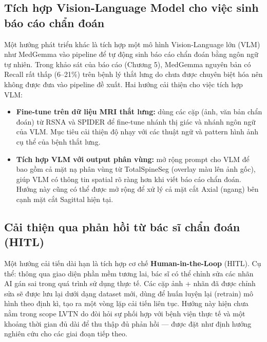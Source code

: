 \subsection{Tích hợp Vision-Language Model cho việc sinh báo cáo chẩn đoán}
Một hướng phát triển khác là tích hợp một mô hình Vision-Language lớn (VLM) như MedGemma vào pipeline để tự động sinh báo cáo chẩn đoán bằng ngôn ngữ tự nhiên. Trong khảo sát của báo cáo (Chương 5), MedGemma nguyên bản có Recall rất thấp (6--21\%) trên bệnh lý thắt lưng do chưa được chuyên biệt hóa nên không được đưa vào pipeline đề xuất. Hai hướng cải thiện cho việc tích hợp VLM:
\begin{itemize}
    \item \textbf{Fine-tune trên dữ liệu MRI thắt lưng:} dùng các cặp (ảnh, văn bản chẩn đoán) từ RSNA và SPIDER để fine-tune nhánh thị giác và nhánh ngôn ngữ của VLM. Mục tiêu cải thiện độ nhạy với các thuật ngữ và pattern hình ảnh cụ thể của bệnh thắt lưng.
    \item \textbf{Tích hợp VLM với output phân vùng:} mở rộng prompt cho VLM để bao gồm cả mặt nạ phân vùng từ TotalSpineSeg (overlay màu lên ảnh gốc), giúp VLM có thông tin spatial rõ ràng hơn khi viết báo cáo chẩn đoán. Hướng này cũng có thể được mở rộng để xử lý cả mặt cắt Axial (ngang) bên cạnh mặt cắt Sagittal hiện tại.
\end{itemize}

\subsection{Cải thiện qua phản hồi từ bác sĩ chẩn đoán (HITL)}
Một hướng cải tiến dài hạn là tích hợp cơ chế \textbf{Human-in-the-Loop} (HITL). Cụ thể: thông qua giao diện phần mềm tương lai, bác sĩ có thể chỉnh sửa các nhãn AI gán sai trong quá trình sử dụng thực tế. Các cặp ảnh + nhãn đã được chỉnh sửa sẽ được lưu lại dưới dạng dataset mới, dùng để huấn luyện lại (retrain) mô hình theo định kì, tạo ra một vòng lặp cải tiến liên tục. Hướng này hiện chưa nằm trong scope LVTN do đòi hỏi sự phối hợp với bệnh viện thực tế và một khoảng thời gian đủ dài để thu thập đủ phản hồi --- được đặt như định hướng nghiên cứu cho các giai đoạn tiếp theo.